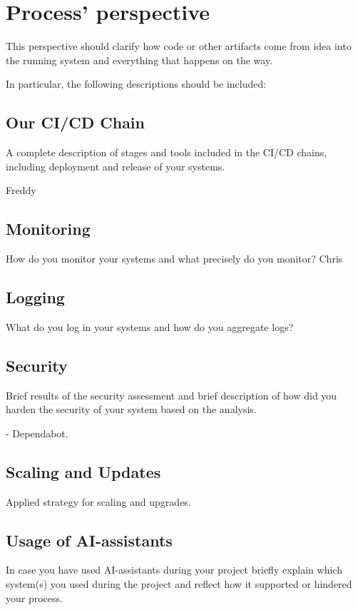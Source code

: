 \section{Process' perspective}
This perspective should clarify how code or other artifacts come from idea into the running system and everything that happens on the way.

In particular, the following descriptions should be included:

\subsection{Our CI/CD Chain}
A complete description of stages and tools included in the CI/CD chains, including deployment and release of your systems.

Freddy

\subsection{Monitoring}
How do you monitor your systems and what precisely do you monitor?
Chris

\subsection{Logging}
What do you log in your systems and how do you aggregate logs?

\subsection{Security}
Brief results of the security assessment and brief description of how did you harden the security of your system based on the analysis.

- Dependabot. 

\subsection{Scaling and Updates}
Applied strategy for scaling and upgrades.

\subsection{Usage of AI-assistants}
In case you have used AI-assistants during your project briefly explain which system(s) you used during the project and reflect how it supported or hindered your process.
